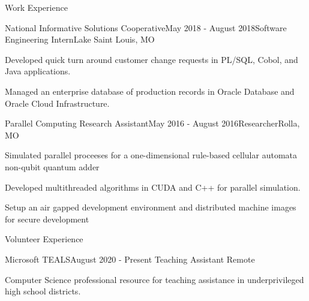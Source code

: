 \documentclass{resume}
\begin{document}
\begin{rSection}{Work Experience}
\begin{rSubsection}{National Informative Solutions Cooperative}{May 2018 - August 2018}{Software Engineering Intern}{Lake Saint Louis, MO}
    \item Developed quick turn around customer change requests in PL/SQL, Cobol, and Java applications.
    \item Managed an enterprise database of production records in Oracle Database and Oracle Cloud Infrastructure. 
\end{rSubsection}
\begin{rSubsection}{Parallel Computing Research Assistant}{May 2016 - August 2016}{Researcher}{Rolla, MO}
    \item Simulated parallel proceeses for a one-dimensional rule-based cellular automata non-qubit quantum adder 
    \item Developed multithreaded algorithms in CUDA and C++ for parallel simulation. 
    \item Setup an air gapped development environment and distributed machine images for secure development
\end{rSubsection}
\end{rSection} 

\begin{rSection}{Volunteer Experience}
\begin{rSubsection}{Microsoft TEALS}{August 2020 - Present} {Teaching Assistant} {Remote} 
    \item Computer Science professional resource for teaching assistance in underprivileged high school districts.
\end{rSubsection}
\end{rSection}
\clearpage
\end{document}
